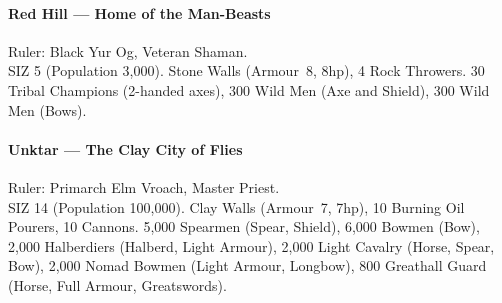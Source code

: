 \documentclass[itdr]{subfiles}
\begin{document}
\paragraph{Red Hill --- Home of the Man-Beasts}
Ruler: Black Yur Og, Veteran Shaman.\\
SIZ 5 (Population 3,000).
Stone Walls (Armour~8, 8hp), 4 Rock Throwers. 30 Tribal Champions (2-handed axes), 300 Wild Men (Axe and Shield), 300 Wild Men (Bows).

\paragraph{Unktar --- The Clay City of Flies}
Ruler: Primarch Elm Vroach, Master Priest.\\
SIZ 14 (Population 100,000).
Clay Walls (Armour~7, 7hp), 10 Burning Oil Pourers, 10 Cannons. 5,000 Spearmen (Spear, Shield), 6,000 Bowmen (Bow), 2,000 Halberdiers (Halberd, Light Armour), 2,000 Light Cavalry (Horse, Spear, Bow), 2,000 Nomad Bowmen (Light Armour, Longbow), 800 Greathall Guard (Horse, Full Armour, Greatswords).
\end{document}
